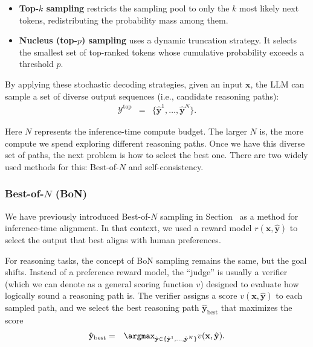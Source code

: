 \begin{itemize}
\item \vspace{0.5em} \textbf{Top-$k$ sampling} restricts the sampling pool to only the $k$ most likely next tokens, redistributing the probability mass among them.
\item \vspace{0.3em} \textbf{Nucleus (top-$p$) sampling} uses a dynamic truncation strategy. It selects the smallest set of top-ranked tokens whose cumulative probability exceeds a threshold $p$.
\end{itemize}
\vspace{0.5em}

By applying these stochastic decoding strategies, given an input $\mathbf{x}$, the LLM can sample a set of diverse output sequences (i.e., candidate reasoning paths):
\begin{eqnarray}
\mathcal{Y}^{\mathrm{top}} & = & \{\hat{\mathbf{y}}^1, \dots, \hat{\mathbf{y}}^N\}.
\end{eqnarray}

\noindent Here $N$ represents the inference-time compute budget. The larger $N$ is, the more compute we spend exploring different reasoning paths. Once we have this diverse set of paths, the next problem is how to select the best one. There are two widely used methods for this: Best-of-$N$ and self-consistency.

\subsubsection{Best-of-$N$ (BoN)}
We have previously introduced Best-of-$N$ sampling in Section \ChapterLLMTuning\ as a method for inference-time alignment. In that context, we used a reward model $r(\mathbf{x}, \hat{\mathbf{y}})$ to select the output that best aligns with human preferences.

For reasoning tasks, the concept of BoN sampling remains the same, but the goal shifts. Instead of a preference reward model, the ``judge'' is usually a verifier (which we can denote as a general scoring function $v$) designed to evaluate how logically sound a reasoning path is. The verifier assigns a score $v(\mathbf{x}, \hat{\mathbf{y}})$ to each sampled path, and we select the best reasoning path $\hat{\mathbf{y}}_{\mathrm{best}}$ that maximizes the score
\begin{eqnarray}
\hat{\mathbf{y}}_{\mathrm{best}} & = & \argmax_{\hat{\mathbf{y}} \in \{\hat{\mathbf{y}}^1, \dots, \hat{\mathbf{y}}^N\}} v(\mathbf{x}, \hat{\mathbf{y}}).
\end{eqnarray}

